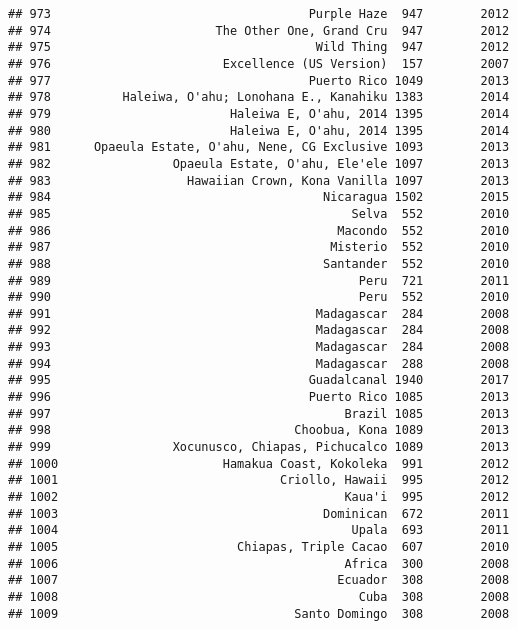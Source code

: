 \documentclass[
]{article}
\begin{document}
\begin{verbatim}
## 973                                    Purple Haze  947        2012
## 974                       The Other One, Grand Cru  947        2012
## 975                                     Wild Thing  947        2012
## 976                        Excellence (US Version)  157        2007
## 977                                    Puerto Rico 1049        2013
## 978          Haleiwa, O'ahu; Lonohana E., Kanahiku 1383        2014
## 979                         Haleiwa E, O'ahu, 2014 1395        2014
## 980                         Haleiwa E, O'ahu, 2014 1395        2014
## 981      Opaeula Estate, O'ahu, Nene, CG Exclusive 1093        2013
## 982                 Opaeula Estate, O'ahu, Ele'ele 1097        2013
## 983                   Hawaiian Crown, Kona Vanilla 1097        2013
## 984                                      Nicaragua 1502        2015
## 985                                          Selva  552        2010
## 986                                        Macondo  552        2010
## 987                                       Misterio  552        2010
## 988                                      Santander  552        2010
## 989                                           Peru  721        2011
## 990                                           Peru  552        2010
## 991                                     Madagascar  284        2008
## 992                                     Madagascar  284        2008
## 993                                     Madagascar  284        2008
## 994                                     Madagascar  288        2008
## 995                                    Guadalcanal 1940        2017
## 996                                    Puerto Rico 1085        2013
## 997                                         Brazil 1085        2013
## 998                                  Choobua, Kona 1089        2013
## 999                 Xocunusco, Chiapas, Pichucalco 1089        2013
## 1000                       Hamakua Coast, Kokoleka  991        2012
## 1001                               Criollo, Hawaii  995        2012
## 1002                                        Kaua'i  995        2012
## 1003                                     Dominican  672        2011
## 1004                                         Upala  693        2011
## 1005                         Chiapas, Triple Cacao  607        2010
## 1006                                        Africa  300        2008
## 1007                                       Ecuador  308        2008
## 1008                                          Cuba  308        2008
## 1009                                 Santo Domingo  308        2008

\end{verbatim}
\end{document}
